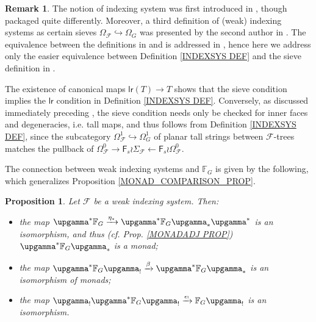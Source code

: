 \documentclass[a4paper,10pt
,draft
]{article}%
\numberwithin{equation}{section}
\numberwithin{figure}{section}
\newtheorem{proposition}[equation]{Proposition}%
\theoremstyle{definition} %
\newtheorem{remark}[equation]{Remark}%
\newcommand{\Fin}{\mathsf{F}}%
\newcommand{\F}{\ensuremath{\mathcal F}}
\newcommand{\1}{\ensuremath{\mathbbm 1}}%
\begin{document}
\begin{remark}
The notion of indexing system
was first introduced in \cite[Def. 3.22]{BH15}, though packaged quite differently.
Moreover, a third definition of (weak) indexing systems as certain sieves 
$\Omega_{\mathcal{F}} \hookrightarrow \Omega_G$
was presented by the second author in \cite[\S 9]{Pe17}. The equivalence between the definitions in \cite{BH15} and \cite{Pe17} is addressed in 
\cite[Rmk. 9.7]{Pe17}, hence here we address only the easier equivalence between Definition \ref{INDEXSYS DEF} and the sieve definition in \cite[\S 9]{Pe17}.

The existence of canonical maps 
$\mathsf{lr}(T) \to T$ shows that the sieve condition
implies the $\mathsf{lr}$ condition
in Definition \ref{INDEXSYS DEF}. 
Conversely, as discussed immediately preceding \cite[Def. 9.5]{Pe17}, the sieve condition needs only be checked for inner faces and degeneracies, i.e. tall maps, 
and thus follows from Definition \ref{INDEXSYS DEF},
since the subcategory 
$\Omega_{\mathcal{F}}^1 \hookrightarrow \Omega^1_G$ 
of planar tall strings between $\mathcal{F}$-trees
matches the pullback of
$\Omega_{\mathcal{F}}^0 \to
\Fin_s \wr \Sigma_{\mathcal{F}} \leftarrow 
\Fin_s \wr \Omega_{\mathcal{F}}^0
$.
\end{remark}


The connection between weak indexing systems and $\mathbb{F}_G$ is given by the following,
which generalizes 
Proposition \ref{MONAD_COMPARISON_PROP}.


\begin{proposition}\label{F_MONAD_COMPARISON_PROP}
	Let $\F$ be a weak indexing system. Then:
	\begin{itemize}
	\item[(i)] the map 
		$\upgamma^{\**} \mathbb{F}_G
		\xrightarrow{\eta_{\**}}
		\upgamma^{\**} \mathbb{F}_G \upgamma_{\**} \upgamma^{\**}$
		is an isomorphism,
		and thus (cf. Prop. \ref{MONADADJ PROP})
		$\upgamma^{\**} \mathbb{F}_G \upgamma_{\**}$
		is a monad;
	\item[(ii)] the map
		$\upgamma^{\**} \mathbb{F}_G \upgamma_{!}
		\xrightarrow{\beta}
		\upgamma^{\**} \mathbb{F}_G \upgamma_{\**}$ is an isomorphism of monads;
	\item[(iii)] the map
		$\upgamma_{!}\upgamma^{\**} \mathbb{F}_G \upgamma_{!}
		\xrightarrow{\epsilon_!}
		\mathbb{F}_G \upgamma_{!}$ is an isomorphism.
	\end{itemize}
\end{proposition}
\end{document}
